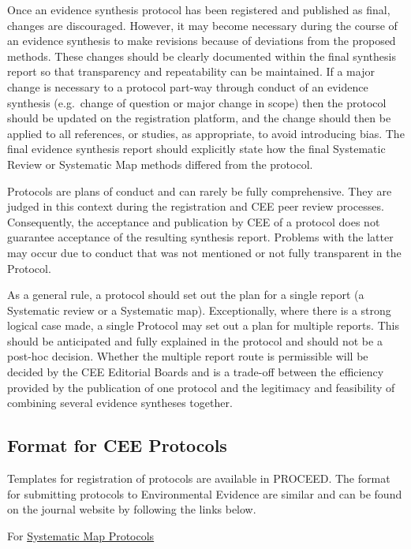 \documentclass[
  letterpaper,
  DIV=11,
  numbers=noendperiod]{scrreprt}
\begin{document}
Once an evidence synthesis protocol has been registered and published as
final, changes are discouraged. However, it may become necessary during
the course of an evidence synthesis to make revisions because of
deviations from the proposed methods. These changes should be clearly
documented within the final synthesis report so that transparency and
repeatability can be maintained. If a major change is necessary to a
protocol part-way through conduct of an evidence synthesis (e.g.~change
of question or major change in scope) then the protocol should be
updated on the registration platform, and the change should then be
applied to all references, or studies, as appropriate, to avoid
introducing bias. The final evidence synthesis report should explicitly
state how the final Systematic Review or Systematic Map methods differed
from the protocol.

Protocols are plans of conduct and can rarely be fully comprehensive.
They are judged in this context during the registration and CEE peer
review processes. Consequently, the acceptance and publication by CEE of
a protocol does not guarantee acceptance of the resulting synthesis
report. Problems with the latter may occur due to conduct that was not
mentioned or not fully transparent in the Protocol.

As a general rule, a protocol should set out the plan for a single
report (a Systematic review or a Systematic map). Exceptionally, where
there is a strong logical case made, a single Protocol may set out a
plan for multiple reports. This should be anticipated and fully
explained in the protocol and should not be a post-hoc decision. Whether
the multiple report route is permissible will be decided by the CEE
Editorial Boards and is a trade-off between the efficiency provided by
the publication of one protocol and the legitimacy and feasibility of
combining several evidence syntheses together.

\subsection{\texorpdfstring{\textbf{Format for CEE
Protocols}}{Format for CEE Protocols}}\label{format-for-cee-protocols}

Templates for registration of protocols are available in PROCEED. The
format for submitting protocols to Environmental Evidence are similar
and can be found on the journal website by following the links below.

For
\href{https://environmentalevidencejournal.biomedcentral.com/submission-guidelines/preparing-your-manuscript/systematic-map-protocol}{Systematic
Map Protocols}
\end{document}
